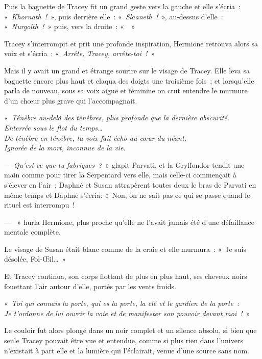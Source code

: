 Puis la baguette de Tracey fit un grand geste vers la gauche et elle s'écria~: «~\emph{Khornath~!}~», puis derrière elle~: «~\emph{Slaaneth~!}~», au-dessus d'elle~: «~\emph{Nurgolth~!}~» puis, vers la droite~: «~~»

Tracey s'interrompit et prit une profonde inspiration, Hermione retrouva alors sa voix et s'écria~: «~\emph{Arrête, Tracey, arrête-toi~!}~»

Mais il y avait un grand et étrange sourire sur le visage de Tracey. Elle leva sa baguette encore plus haut et claqua des doigts une troisième fois~; et lorsqu'elle parla de nouveau, sous sa voix aiguë et féminine on crut entendre le murmure d'un chœur plus grave qui l'accompagnait.

«~\emph{Ténèbre au-delà des ténèbres, plus profonde que la dernière obscurité.\\
Enterrée sous le flot du temps…\\
De ténèbre en ténèbre, ta voix fait écho au cœur du néant,\\
Ignorée de la mort, inconnue de la vie.}

--- \emph{Qu'est-ce que tu fabriques~?}~» glapit Parvati, et la Gryffondor tendit une main comme pour tirer la Serpentard vers elle, mais celle-ci commençait à s'élever en l'air~; Daphné et Susan attrapèrent toutes deux le bras de Parvati en même temps et Daphné s'écria: «~Non, on ne sait pas ce qui se passe quand le rituel est interrompu~!

--- ~» hurla Hermione, plus proche qu'elle ne l'avait jamais été d'une défaillance mentale complète.

Le visage de Susan était blanc comme de la craie et elle murmura~: «~Je suis désolée, Fol-Œil…~»

Et Tracey continua, son corps flottant de plus en plus haut, ses cheveux noirs fouettant l'air autour d'elle, portés par les vents froids.

«~\emph{Toi qui connais la porte, qui es la porte, la clé et le gardien de la porte~:\\ Je t'ordonne de lui ouvrir la voie et de manifester son pouvoir devant moi~!}~»

Le couloir fut alors plongé dans un noir complet et un silence absolu, si bien que seule Tracey pouvait être vue et entendue, comme si plus rien dans l'univers n'existait à part elle et la lumière qui l'éclairait, venue d'une source sans nom.

